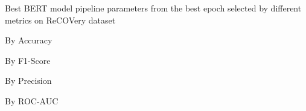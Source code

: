 \begin{table}[!htbp]
    \caption{Best BERT model pipeline parameters from the best epoch selected by different metrics on ReCOVery dataset}
    \label{tab:recovery_bert_pipeline_params}
    \centering

    \begin{subtable}[t]{0.48\linewidth}
        \scriptsize
        \caption{By Accuracy}
        
    \end{subtable}
    \hfill
    \begin{subtable}[t]{0.48\linewidth}
        \scriptsize
        \caption{By F1-Score}
        
    \end{subtable}

    \vspace{1em}

    \begin{subtable}[t]{0.48\linewidth}
        \scriptsize
        \caption{By Precision}
        
    \end{subtable}
    \hfill
    \begin{subtable}[t]{0.48\linewidth}
        \scriptsize
        \caption{By ROC-AUC}
        
    \end{subtable}

\end{table}